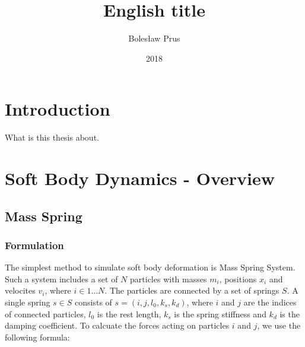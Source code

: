 \documentclass[en]{minipw} %
\title{English title} %
\author{Bolesław Prus}
\date{2018}
\begin{document}
\sloppy






\setcounter{page}{1}

\begin{abstract}



\end{abstract}

\begin{streszczenie}



\end{streszczenie}


\makestatement


\cleardoublepage
\tableofcontents


\cleardoublepage
\pagestyle{fancy}

\chapter*{Introduction}
What is this thesis about.


\chapter{Soft Body Dynamics - Overview}

\section{Mass Spring}
\subsection{Formulation}
The simplest method to simulate soft body deformation is Mass Spring System.
Such a system includes a set of $N$ particles with masses $m_i$, positions $x_i$ and velocites $v_i$, where $i \in 1...N$. The particles are connected by a set of springs $S$. A single spring $s \in S$ consists of $s = (i, j, l_0, k_s, k_d)$, where $i$ and $j$ are the indices of connected particles, $l_0$ is the rest length, $k_s$ is the spring stiffness and $k_d$ is the damping coefficient. To calcuate the forces acting on particles $i$ and $j$, we use the following formula:
\end{document}
